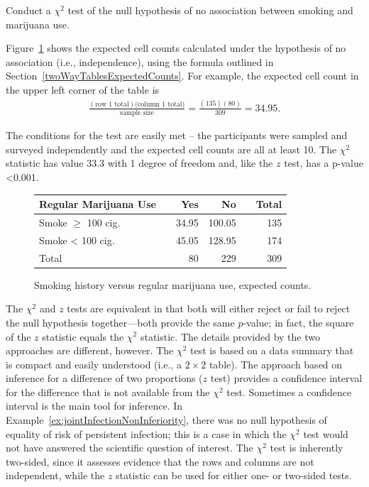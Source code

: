 \begin{examplewrap}
\begin{nexample}{Conduct a $\chi^2$ test of the null hypothesis of no association between smoking and marijuana use.}\label{ex:smoke100RegMarijChiSquared}

  Figure~\ref{figure:smoke100RegMarijuanaExpected} shows the expected cell counts calculated under the hypothesis of no association (i.e., independence), using the formula outlined in Section~\ref{twoWayTablesExpectedCounts}.  For example, the expected cell count in the upper left corner of the table is
\begin{align*}
  \frac{(\text{row 1 total})(\text{column 1 total)}}{\text{sample size}} =
  \frac{(135)(80)}{309} = 34.95.
\end{align*}

The conditions for the test are easily met -- the participants were sampled and surveyed independently and the expected cell counts are all at least 10.  The $\chi^2$ statistic  has value 33.3 with 1 degree of freedom and, like the $z$ test, has a p-value <0.001.
\end{nexample}
\end{examplewrap}


\begin{figure}[ht]
  \centering
  \begin{tabular}{ll rrr r}
    \hline
    Regular Marijuana Use  & \hspace{2mm} & Yes & No & \hspace{2mm} & Total \\
    \hline
    Smoke $\geq$ 100 cig. & & 34.95 & 100.05 &  & 135  \\
    Smoke < 100 cig. & & 45.05 & 128.95 &  &  174  \\
        Total & & 80 & 229 & & 309 \\
    \hline
  \end{tabular}
    \caption{Smoking history versus regular marijuana use, expected counts.}
    \label{figure:smoke100RegMarijuanaExpected}
\end{figure}

The $\chi^2$ and $z$ tests are equivalent in that both will either reject or fail to reject the null hypothesis together---both provide the same $p$-value; in fact, the square of the $z$ statistic equals the $\chi^2$ statistic.  The details provided by the two approaches are different, however.   The $\chi^2$ test is based on a data summary that is compact and easily understood (i.e., a $2 \times 2$ table).  The approach based on inference for a difference of two proportions ($z$ test) provides a confidence interval for the difference that is not available from the $\chi^2$ test. Sometimes a confidence interval is the main tool for inference.  In Example~\ref{ex:jointInfectionNonInferiority}, there was no null hypothesis of equality of risk of persistent infection; this is a case in which the $\chi^2$ test would not have answered the scientific question of interest. The $\chi^2$ test is inherently two-sided, since it assesses evidence that the rows and columns are not independent, while the $z$ statistic can be used for either one- or two-sided tests.

